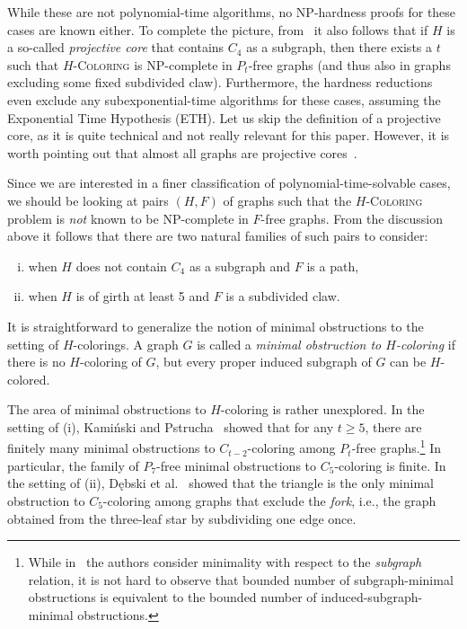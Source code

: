 \documentclass[11pt,a4paper]{article}
\theoremstyle{mystyle}
\newcommand{\colo}[1]{\ensuremath{#1}-\textsc{Coloring}\xspace}
\newcommand{\NP}{\textsf{NP}}
\begin{document}
While these are not polynomial-time algorithms, no \NP-hardness proofs for these cases are known either.
To complete the picture, from~\cite{DBLP:conf/stacs/OkrasaR21} it also follows that if $H$ is a so-called \emph{projective core} that  contains $C_4$ as a subgraph, then there exists a $t$ such that \colo{H} is \NP-complete in $P_t$-free graphs (and thus also in graphs excluding some fixed subdivided claw). Furthermore, the hardness reductions even exclude any subexponential-time algorithms for these cases, assuming the Exponential Time Hypothesis (ETH).
Let us skip the definition of a projective core, as it is quite technical and not really relevant for this paper. However, it is worth pointing out that almost all graphs are projective cores~\cite{DBLP:journals/jgt/LuczakN04,DBLP:journals/dm/HellN92}.

Since we are interested in a finer classification of polynomial-time-solvable cases, we should be looking at pairs $(H,F)$ of graphs such that the \colo{H} problem is \emph{not} known to be \NP-complete in $F$-free graphs. From the discussion above it follows that there are two natural families of such pairs to consider: 
\begin{enumerate}[(i)]
    \item when $H$ does not contain $C_4$ as a subgraph and $F$ is a path,
    \item when $H$ is of girth at least 5 and $F$ is a subdivided claw.
\end{enumerate}

It is straightforward to generalize the notion of minimal obstructions to the setting of $H$-colorings.
A graph $G$ is called a \emph{minimal obstruction to $H$-coloring} if there is no $H$-coloring of $G$, but every proper induced subgraph of $G$ can be $H$-colored.

The area of minimal obstructions to $H$-coloring is rather unexplored.
In the setting of (i), Kami\'{n}ski and Pstrucha~\cite{DBLP:journals/dam/KaminskiP19} showed that for any $t\geq 5$, there are  finitely many minimal obstructions to $C_{t-2}$-coloring among $P_t$-free graphs.\footnote{While in~\cite{DBLP:journals/dam/KaminskiP19} the authors consider minimality with respect to the \emph{subgraph} relation, it is not hard to observe that bounded number of subgraph-minimal obstructions is equivalent to the bounded number of induced-subgraph-minimal obstructions.}
In particular, the family of $P_7$-free minimal obstructions to $C_5$-coloring is finite. 
In the setting of (ii), D\k{e}bski et al.~\cite{debski_et_al:LIPIcs.ISAAC.2022.14} showed that the triangle is the only minimal obstruction to $C_5$-coloring among graphs that exclude the \emph{fork}, i.e., the graph obtained from the three-leaf star by subdividing one edge once.
\end{document}
